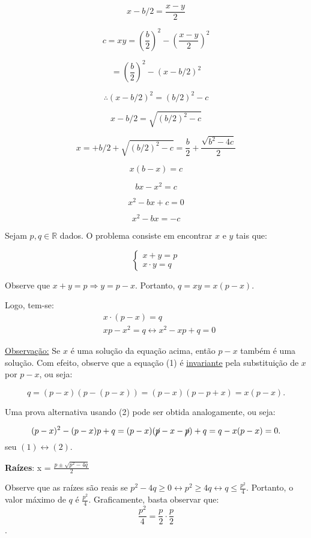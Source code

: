 \documentclass{article}
\begin{document}
\[
x - b/2 = \frac{x - y}{2}
\]

\[
c = xy = (\frac{b}{2})^2 - (\frac{x - y}{2})^2
\]

\[
= (\frac{b}{2})^2 - (x - b/2)^2
\]

\[
\therefore (x - b/2)^2 = (b/2)^2 - c
\]

\[
x - b/2 = \sqrt{(b/2)^2 - c}
\]

\[
x = + b/2 + \sqrt{(b/2)^2 - c} = \frac{b}{2} + \frac{\sqrt{b^2 - 4c}}{2}
\]

\[
x (b - x) = c
\]

\[
bx - x^2 = c
\]

\[
x^2 - bx + c = 0 
\]

\[
x^2 - bx = -c
\]

\pagebreak
Sejam $p, q \in \mathbb{R}$ dados. O problema consiste em encontrar $x$ e $y$ tais que:

\[
\left\{
\begin{array}{cc}
   x +  y = p \\
   x \cdot y = q
\end{array}
\right.
\]

Observe que $x + y = p \Rightarrow y = p - x$. Portanto, $q = xy = x(p - x)$.

Logo, tem-se:
\begin{align*}
&\boxed{x \cdot (p - x) = q} \tag{1} \\
&xp - x^2 = q \leftrightarrow \boxed{x^2 - xp + q = 0} \tag{2}
\end{align*}

\underline{Observação:} Se $x$ é uma solução da equação acima, então $p - x$ também é uma solução. Com efeito, observe que a equação (1) é \underline{invariante} pela substituição de $x$ por $p - x$, ou seja:

\[
q = (p - x) (p - (p-x)) = (p-x)(p - p + x) = x (p - x).
\]

Uma prova alternativa usando (2) pode ser obtida analogamente, ou seja:

\[
(p-x)^2 - (p-x) p + q = (p - x)(\cancel{p} - x - \cancel{p}) + q = q - x (p-x) = 0.
\]
seu $(1) \leftrightarrow (2)$.


\textbf{Raízes}: x = $\frac{p \pm \sqrt{p^2 - 4q}}{2}$


Observe que as raízes são reais se $p^2 - 4q \geq 0 \leftrightarrow p^2 \geq 4q \leftrightarrow q \leq \frac{p^2}{4}$. Portanto, o valor máximo de $q$ é $\frac{p^2}{4}$. Graficamente, basta observar que: 
$$\frac{p^2}{4} = \frac{p}{2} \cdot \frac{p}{2}$$.
\end{document}
